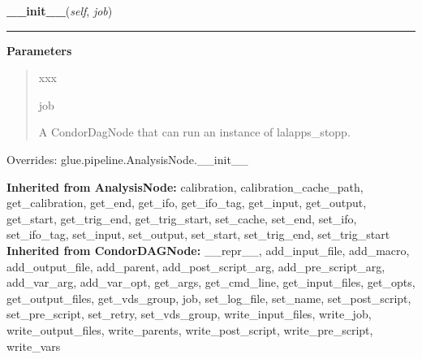     \begin{boxedminipage}{\textwidth}

    \raggedright \textbf{\_\_init\_\_}(\textit{self}, \textit{job})

    \vspace{-1.5ex}

    \rule{\textwidth}{0.5\fboxrule}
    \vspace{1ex}

      \textbf{Parameters}
      \begin{quote}
        \begin{Ventry}{xxx}

          \item[job]

          A CondorDagNode that can run an instance of lalapps\_stopp.

        \end{Ventry}

      \end{quote}

    \vspace{1ex}

      Overrides: glue.pipeline.AnalysisNode.\_\_init\_\_

    \end{boxedminipage}

  \textbf{Inherited from AnalysisNode:}
    calibration,
    calibration\_cache\_path,
    get\_calibration,
    get\_end,
    get\_ifo,
    get\_ifo\_tag,
    get\_input,
    get\_output,
    get\_start,
    get\_trig\_end,
    get\_trig\_start,
    set\_cache,
    set\_end,
    set\_ifo,
    set\_ifo\_tag,
    set\_input,
    set\_output,
    set\_start,
    set\_trig\_end,
    set\_trig\_start
    \\
  \textbf{Inherited from CondorDAGNode:}
    \_\_repr\_\_,
    add\_input\_file,
    add\_macro,
    add\_output\_file,
    add\_parent,
    add\_post\_script\_arg,
    add\_pre\_script\_arg,
    add\_var\_arg,
    add\_var\_opt,
    get\_args,
    get\_cmd\_line,
    get\_input\_files,
    get\_opts,
    get\_output\_files,
    get\_vds\_group,
    job,
    set\_log\_file,
    set\_name,
    set\_post\_script,
    set\_pre\_script,
    set\_retry,
    set\_vds\_group,
    write\_input\_files,
    write\_job,
    write\_output\_files,
    write\_parents,
    write\_post\_script,
    write\_pre\_script,
    write\_vars
